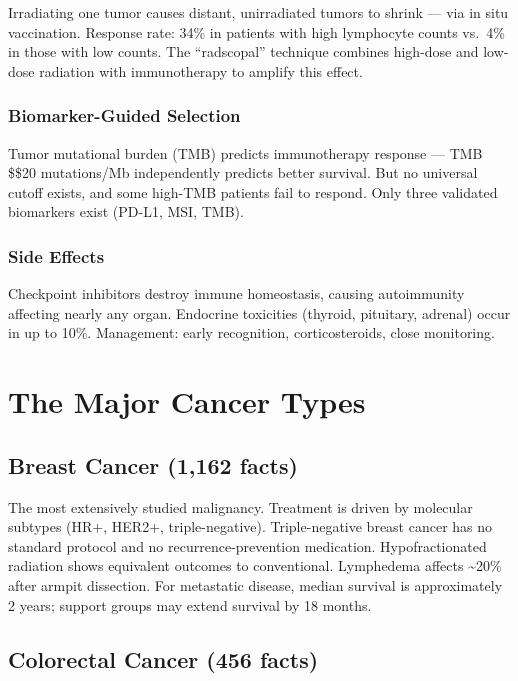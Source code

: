 Irradiating one tumor causes distant, unirradiated tumors to shrink ---
via in situ vaccination. Response rate: 34\% in patients with high
lymphocyte counts vs.~4\% in those with low counts. The ``radscopal''
technique combines high-dose and low-dose radiation with immunotherapy
to amplify this effect.

\subsubsection{Biomarker-Guided
Selection}\label{biomarker-guided-selection}

Tumor mutational burden (TMB) predicts immunotherapy response --- TMB
\$\geq\$20 mutations/Mb independently predicts better survival. But no
universal cutoff exists, and some high-TMB patients fail to respond.
Only three validated biomarkers exist (PD-L1, MSI, TMB).

\subsubsection{Side Effects}\label{side-effects}

Checkpoint inhibitors destroy immune homeostasis, causing autoimmunity
affecting nearly any organ. Endocrine toxicities (thyroid, pituitary,
adrenal) occur in up to 10\%. Management: early recognition,
corticosteroids, close monitoring.

\newpage

\section{The Major Cancer Types}\label{the-major-cancer-types}

\subsection{Breast Cancer (1,162 facts)}\label{breast-cancer-1162-facts}

The most extensively studied malignancy. Treatment is driven by
molecular subtypes (HR+, HER2+, triple-negative). Triple-negative breast
cancer has no standard protocol and no recurrence-prevention medication.
Hypofractionated radiation shows equivalent outcomes to conventional.
Lymphedema affects \textasciitilde20\% after armpit dissection. For
metastatic disease, median survival is approximately 2 years; support
groups may extend survival by 18 months.

\subsection{Colorectal Cancer (456
facts)}\label{colorectal-cancer-456-facts}

